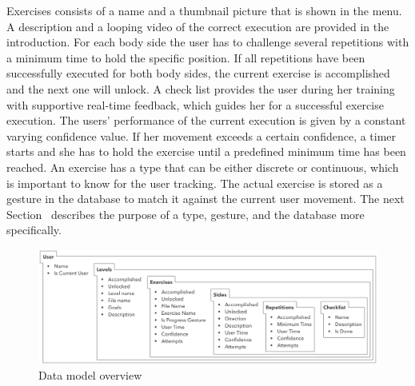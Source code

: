 Exercises consists of a name and a thumbnail picture that is shown in the menu. A description and a looping video of the correct execution are provided in the introduction.
For each body side the user has to challenge several repetitions with a minimum time to hold the specific position.
If all repetitions have been successfully executed for both body sides, the current exercise is accomplished and the next one will unlock.
A check list provides the user during her training with supportive real-time feedback, which guides her for a successful exercise execution.
The users' performance of the current execution is given by a constant varying confidence value. If her movement exceeds a certain confidence, a timer starts and she has to hold the exercise until a predefined minimum time has been reached.
An exercise has a type that can be either discrete or continuous, which is important to know for the user tracking. 
The actual exercise is stored as a gesture in the database to match it against the current user movement.
The next Section~\textit{} describes the purpose of a type, gesture, and the database more specifically.

\begin{figure}[htb]
	\centering
	\begin{minipage}[t]{1\linewidth}
		\centering
		\includegraphics[width=1\linewidth]{Pictures/5_2_dataModel}
		\caption{Data model overview}
		\label{fig:5_2_dataModel}
	\end{minipage}
\end{figure}

